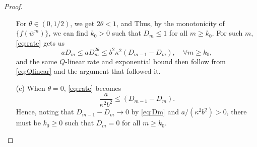 \documentclass{article}
\newcommand{\alerttt}[1]{{#1}}
\theoremstyle{plain}
\theoremstyle{definition}
\theoremstyle{remark}
\newcommand{\I}{\mathcal{I}}
\newcommand{\jh}[1]{\footnote{\textbf{JH:} #1}}
\DeclareMathOperator*{\dist}{dist}
\newcommand{\norm}[1]{{\left\|{#1}\right\|}}
\begin{document}
\begin{proof}
\begin{enumerate}[leftmargin=*]
				For $\theta \in \alerttt{(0,1/2)}$, we get
				$\alerttt{2\theta} < 1$, and
				Thus, by the monotonicity of $\{f(\bar{w}^m)\}$, we
				can find $k_0 > 0$ such that $D_m \leq 1$ for all $m
				\geq k_0$.
				For such $m$, \cref{eq:rate} gets us
				\[
					a D_m \leq a D_m^{\alerttt{2\theta}} \leq
					{b^2}\alerttt{\kappa^2} \left(D_{m-1} - D_m\right),
					\quad \forall m \geq k_0,
				\]
				and the same $Q$-linear rate and exponential bound
				then follow from \cref{eq:Qlinear} and the argument
				that followed it.
			\item[(c)] When $\theta = \alerttt{0}$, \cref{eq:rate} becomes
				\[
					\frac{a}{\alerttt{\kappa^2}b^2} \leq \left( D_{m-1} - D_m
					\right).
				\]
				Hence, noting that $D_{m-1} -  D_m \to 0$ by \cref{eq:Dm} and 
				$a/(\alerttt{\kappa^2}b^2)>0$,  
				there must be $k_0\geq 0$ such that
				$D_m = 0$ for all $m \geq k_0$.
%				

\end{enumerate}
\end{proof}
\end{document}
